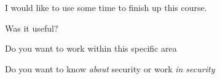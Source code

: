 \documentclass[Screen16to9,17pt]{foils}
\begin{document}


I would like to use some time to finish up this course.

\begin{list2}
\item Was it useful?
\item Do you want to work within this specific area
\item Do you want to know \emph{about} security or work \emph{in security}
\end{list2}
\end{document}
